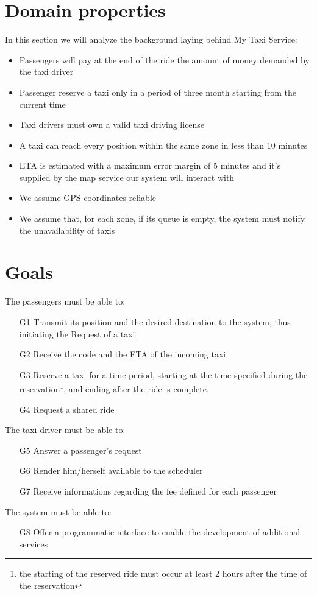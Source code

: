 \section{Domain properties}
In this section we will analyze the background laying behind My Taxi Service:
\begin{itemize}
  \item Passengers will pay at the end of the ride the amount of money demanded by the taxi driver
  \item Passenger reserve a taxi only in a period of three month starting from the current time
  \item Taxi drivers must own a valid taxi driving license
  \item A taxi can reach every position within the same zone in less than 10 minutes
  \item ETA is estimated with a maximum error margin of 5 minutes and it's supplied by the map service our system will interact with
  \item We assume GPS coordinates reliable
  \item We assume that, for each zone, if its queue is empty, the system must notify the unavailability of taxis
 
\end{itemize}
\section{Goals}
The passengers must be able to:
\begin{itemize}
  \item [G1] Transmit its position and the desired destination to the system, thus initiating the Request of a taxi
  \item [G2] Receive the code and the ETA of the incoming taxi
  \item [G3] Reserve a taxi for a time period, starting at the time specified during the reservation\footnote{the starting of the
  reserved ride must occur at least 2 hours after the time of the reservation}, and ending after the ride is complete.
  \item [G4] Request a shared ride
\end{itemize}
The taxi driver must be able to:
\begin{itemize}
  \item [G5] Answer a passenger's request
  \item [G6] Render him/herself available to the scheduler
  \item [G7] Receive informations regarding the fee defined for each passenger
\end{itemize}
The system must be able to:
\begin{itemize}
  \item [G8] Offer a programmatic interface to enable the development of additional services
\end{itemize}


